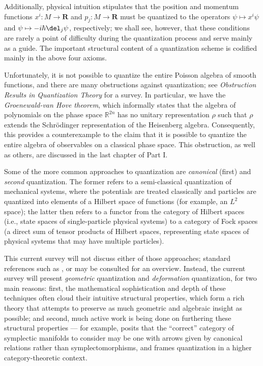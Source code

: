 \documentclass{tufte-handout}
\begin{document}
Additionally, physical intuition stipulates that the position and momentum functions $x^i: M \to \mathbf{R}$ and $p_j: M \to \mathbf{R}$ must be quantized to the operators $\psi \mapsto x^i\psi$ and $\psi \mapsto -i\hbar\del_j\psi$, respectively; we shall see, however, that these conditions are rarely a point of difficulty during the quantization process and serve mainly as a guide. The important structural content of a quantization scheme is codified mainly in the above four axioms.

Unfortunately, it is not possible to quantize the entire Poisson algebra of smooth functions, and there are many obstructions against quantization; see \emph{Obstruction Results in Quantization Theory} \cite{gotay} for a survey. In particular, we have the \emph{Groenewald-van Hove theorem}, which informally states that the algebra of polynomials on the phase space $\mathbb{R}^{2n}$ has no unitary representation $\rho$ such that $\rho$ extends the Schr\"{o}dinger representation of the Heisenberg algebra. Consequently, this provides a counterexample to the claim that it is possible to quantize the entire algebra of observables on a classical phase space. This obstruction, as well as others, are discussed in the last chapter of Part I.

Some of the more common approaches to quantization are \emph{canonical} (first) and \emph{second} quantization. The former refers to a semi-classical quantization of mechanical systems, where the potentials are treated classically and particles are quantized into elements of a Hilbert space of functions (for example, an $L^2$ space); the latter then refers to a functor from the category of Hilbert spaces (i.e., state spaces of single-particle physical systems) to a category of Fock spaces (a direct sum of tensor products of Hilbert spaces, representing state spaces of physical systems that may have multiple particles).

This current survey will not discuss either of those approaches; standard references such as \cite{sakurai}, \cite{reedsimon} or \cite{folland} may be consulted for an overview. Instead, the current survey will present \emph{geometric} quantization and \emph{deformation} quantization, for two main reasons: first, the mathematical sophistication and depth of these techniques often cloud their intuitive structural properties, which form a rich theory that attempts to preserve as much geometric and algebraic insight as possible; and second, much active work is being done on furthering these structural properties --- for example, \cite{weinstein} posits that the ``correct'' category of symplectic manifolds to consider may be one with arrows given by canonical relations rather than symplectomorphisms, and \cite{hawkins} frames quantization in a higher category-theoretic context.
\end{document}
